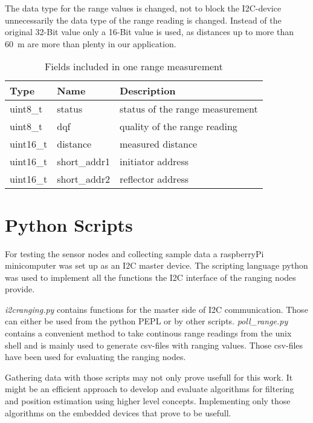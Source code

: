 The data type for the range values is changed, not to block the I2C-device unnecessarily the data type of the range reading is changed.
Instead of the original 32-Bit value only a 16-Bit value is used, as distances up to more than \SI{60}{\metre} are more than plenty in our application.

\begin{table}
	
	\begin{tabularx}{\columnwidth}{l | l | X}
	Type & Name & Description \\ \hline
		uint8\_t  & status       & status of the range measurement \\
		uint8\_t  & dqf          & quality of the range reading \\
		uint16\_t & distance     & measured distance \\
		uint16\_t & short\_addr1 & initiator address \\
		uint16\_t & short\_addr2 & reflector address \\
	\end{tabularx}

	\caption{Fields included in one range measurement}
	\label{rangefields}
	
\end{table}




%
%

\section{Python Scripts}

For testing the sensor nodes and collecting sample data a raspberryPi minicomputer was set up as an I2C master device.
The scripting language python was used to implement all the functions the I2C interface of the ranging nodes provide.

\emph{i2cranging.py} contains functions for the master side of I2C communication. Those can either be used from the python PEPL or by other scripts.
\emph{poll\_range.py} contains a convenient method to take continous range readings from the unix shell and is mainly used to generate csv-files with ranging values.
Those csv-files have been used for evaluating the ranging nodes.

Gathering data with those scripts may not only prove usefull for this work.
It might be an efficient approach to develop and evaluate algorithms for filtering and position estimation using higher level concepts.
Implementing only those algorithms on the embedded devices that prove to be usefull.



